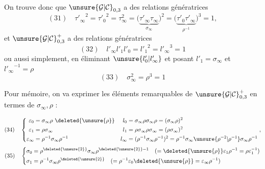 
On trouve donc que $\unsure{\mathcal{G}|\mathcal{C}}_{0,3}$ a des  relations génératrices
\[
(31)\quad
{\tau'_\infty}^{2}={\tau'_0}^{2}=\tau_\infty^2
=\bigl(\underbrace{\tau'_\infty\tau_\infty}_{\sigma_\infty}\bigr)^2
=\bigl(\underbrace{\tau'_0\tau'_\infty}_{\rho^{-1}}\bigr)^3=1,
\]
et $\unsure{\mathcal{G}|\mathcal{C}}_{0,3}^{+}$ a des relations génératrices
\[
(32)\quad l'_\infty l'_1l'_0={l'_1}^{2}={l'_\infty}^{3}=1
\]
ou aussi simplement, en éliminant $\unsure{l'_0|l'_\infty}$ et posant
$l'_1=\sigma_\infty$ et ${l'_\infty}^{-1}=\rho$
\[
(33)\quad\boxed{\sigma_\infty^2=\rho^3=1}
\]

Pour mémoire, on va exprimer les éléments remarquables de $\unsure{\mathcal{G}|\mathcal{C}}_{0,3}^{+}$ en termes de $\sigma_\infty,\rho$ :


\[
(34)\quad\left\{\begin{aligned}
\varepsilon_0&=\sigma_\infty\rho\ \deleted{\unsure{\rho}}&
l_0&=\sigma_\infty\rho\sigma_\infty\rho=(\sigma_\infty\rho)^2\\
\varepsilon_1&=\rho\sigma_\infty&
l_1&=\rho\sigma_\infty\rho\sigma_\infty=(\rho\sigma_\infty)^2\\
\varepsilon_\infty&=\rho^{-1}\sigma_\infty\rho^{-1}&
l_\infty&=(\rho^{-1}\sigma_\infty\rho^{-1})^2
=\rho^{-1}\sigma_\infty\unsure{\rho^{-2}|\rho^{-1}}\sigma_\infty\rho^{-1}
\end{aligned}\right.,
\]
\[
(35)\quad\left\{\begin{aligned}
\sigma_0&=\rho^{\deleted{\unsure{2}}}\sigma_\infty\rho^{\deleted{\unsure{2}}-1}
\quad(=\deleted{\unsure{\rho}}\varepsilon_1\rho^{-1}=\rho\varepsilon_1^{-1})\\
\sigma_1&=\rho^{-1}\sigma_\infty\rho^{\deleted{\unsure{2}}}
\quad(=\rho^{-1}\varepsilon_0\deleted{\unsure{\rho}}=\varepsilon_\infty\rho^{-1})
\end{aligned}\right.
\]

